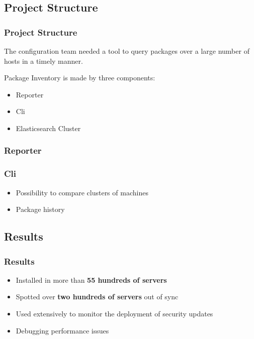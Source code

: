 \documentclass[aspectratio=169]{beamer}
\begin{document}

\subsection{Project Structure}
\begin{frame}
    \frametitle{Project Structure}
    The configuration team needed a tool to query packages over a large
    number of hosts in a timely manner.

    Package Inventory is made by three components:
    \begin{itemize}
        \item Reporter
        \item Cli
        \item Elasticsearch Cluster
    \end{itemize}
\end{frame}


\begin{frame}
    \frametitle{Reporter}
\end{frame}


\begin{frame}
    \frametitle{Cli}
    \begin{itemize}
        \item Possibility to compare clusters of machines
        \item Package history
    \end{itemize}
\end{frame}


\subsection{Results}
\begin{frame}
    \frametitle{Results}
    \begin{itemize}
        \item Installed in more than \textbf{55 hundreds of servers}
        \item Spotted over \textbf{two hundreds of servers} out of sync
        \item Used extensively to monitor the deployment of security updates
        \item Debugging performance issues
    \end{itemize}
\end{frame}
\end{document}
